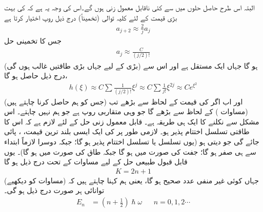  البتہ اس طرح حاصل حلوں میں سے کئی ناقابل  معمول زنی   ہوں گے۔اس کی وجہ یہ ہے کہ  کی بہت بڑی قیمت کے لئے کلیہ توالی (تخمیناً) درج ذیل روپ اختیار کرتا ہے
\begin{align*}
a_{j+2}\approx\frac{2}{j}a_{j}
\end{align*}
جس کا تخمینی حل
\begin{align*}
a_{j}\approx\frac{C}{(j/2)!}
\end{align*}
ہو گا جہاں  ایک مستقل ہے اور اس سے (بڑی  کے لیے جہاں بڑی طاقتیں غالب ہوں گی) درج ذیل حاصل ہو گا،
\begin{align*}
h(\xi)\approx C\sum\frac{1}{(j/2)!}\xi^{j}\approx C\sum\frac{1}{j!}\xi^{2j}\approx Ce^{\xi^{2}}
\end{align*}
اور اب اگر  کی قیمت  کے لحاظ سے بڑھے تب  (جس کو ہم حاصل کرنا چاہتے ہیں) 
  (مساوات ) کے لحاظ سے بڑھے گا جو وہی متقاربی 
 روپ ہے جو ہم نہیں چاہتے۔ اس مشکل سے نکلنے کا ایک ہی طریقہ ہے۔ قابل معمول زنی   حل کے لئے لازم ہے کہ اس کا طاقتی تسلسل اختتام پذیر ہو۔ لازمی طور پر  کی ایک ایسی بلند ترین قیمت، ، پائی جائے گی جو  دیتی ہو (یوں  تسلسل یا  تسلسل اختتام پذیر ہو گا؛ جبکہ دوسرا لازماً ابتداء سے ہی صفر ہو گا؛ جفت  کی صورت میں  ہو گا جبکہ طاق  کی صورت میں  ہو گا)۔ یوں قابل قبول طبیعی حل کے لیے مساوات  کے تحت درج ذیل ہو گا
\begin{align*}
K=2n+1
\end{align*}
 جہاں  کوئی غیر منفی عدد صحیح ہو گا، یعنی ہم کہنا چاہتے ہیں کہ (مساوات  کو دیکھیے) توانائی ہر صورت درج ذیل ہو گی۔
\begin{align}
E_{n}&=(n+\tfrac{1}{2} )\hslash\omega && n=0,1,2\cdots
\end{align}
